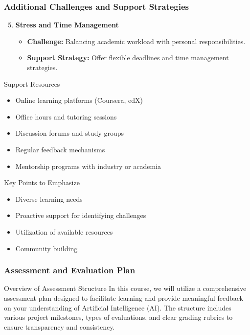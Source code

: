 \documentclass[aspectratio=169]{beamer}
\begin{document}
\begin{frame}[fragile]
    \frametitle{Additional Challenges and Support Strategies}
    \begin{enumerate}
        \setcounter{enumi}{4}
        \item \textbf{Stress and Time Management}
            \begin{itemize}
                \item \textbf{Challenge:} Balancing academic workload with personal responsibilities.
                \item \textbf{Support Strategy:} Offer flexible deadlines and time management strategies.
            \end{itemize}
    \end{enumerate}
    
    \begin{block}{Support Resources}
        \begin{itemize}
            \item Online learning platforms (Coursera, edX)
            \item Office hours and tutoring sessions
            \item Discussion forums and study groups
            \item Regular feedback mechanisms
            \item Mentorship programs with industry or academia
        \end{itemize}
    \end{block}

    \begin{block}{Key Points to Emphasize}
        \begin{itemize}
            \item Diverse learning needs
            \item Proactive support for identifying challenges
            \item Utilization of available resources
            \item Community building
        \end{itemize}
    \end{block}
\end{frame}

\begin{frame}[fragile]
    \frametitle{Assessment and Evaluation Plan}
    \begin{block}{Overview of Assessment Structure}
        In this course, we will utilize a comprehensive assessment plan designed to facilitate learning and provide meaningful feedback on your understanding of Artificial Intelligence (AI). The structure includes various project milestones, types of evaluations, and clear grading rubrics to ensure transparency and consistency.
    \end{block}
\end{frame}
\end{document}
